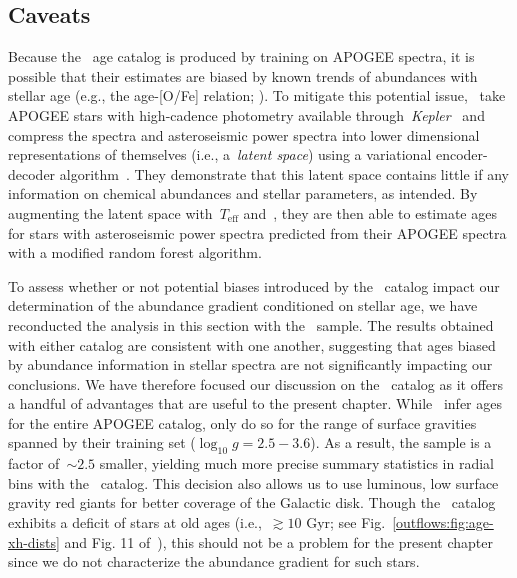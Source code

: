\subsection{Caveats}
\label{outflows:sec:empirical:caveats}
Because the~\citet{Mackereth2019b} age catalog is produced by training on APOGEE
spectra, it is possible that their estimates are biased by known trends of
abundances with stellar age (e.g., the age-[O/Fe] relation;
\citealt{Feuillet2019}).
To mitigate this potential issue,~\citet{Leung2023} take APOGEE stars with
high-cadence photometry available through~\textit{Kepler}~\citep{Borucki2010}
and compress the spectra and asteroseismic power spectra into lower dimensional
representations of themselves (i.e., a~\textit{latent space}) using a
variational encoder-decoder algorithm~\citep[e.g.,][]{LeCun2015}.
They demonstrate that this latent space contains little if any information on
chemical abundances and stellar parameters, as intended.
By augmenting the latent space with~$T_\text{eff}$ and~\feh, they are then able
to estimate ages for stars with asteroseismic power spectra predicted from
their APOGEE spectra with a modified random forest algorithm.
\par
To assess whether or not potential biases introduced by
the~\citet{Mackereth2019b} catalog impact our determination of the abundance
gradient conditioned on stellar age, we have reconducted the analysis in this
section with the~\citet{Leung2023} sample.
The results obtained with either catalog are consistent with one another,
suggesting that ages biased by abundance information in stellar spectra are not
significantly impacting our conclusions.
We have therefore focused our discussion on the~\citet{Mackereth2019b} catalog
as it offers a handful of advantages that are useful to the present chapter.
While~\citet{Mackereth2019b} infer ages for the entire APOGEE catalog,
\citet{Leung2023} only do so for the range of surface gravities spanned by
their training set ($\log_{10} g = 2.5 - 3.6$).
As a result, the sample is a factor of~$\sim$$2.5$ smaller, yielding much more
precise summary statistics in radial bins with the~\citet{Mackereth2019b}
catalog.
This decision also allows us to use luminous, low surface gravity red giants
for better coverage of the Galactic disk.
Though the~\citet{Mackereth2019b} catalog exhibits a deficit of stars at old
ages (i.e.,~$\gtrsim 10$ Gyr; see Fig.~\ref{outflows:fig:age-xh-dists} and Fig.
11 of~\citealt{Leung2023}), this should not be a problem for the present
chapter since we do not characterize the abundance gradient for such stars.

